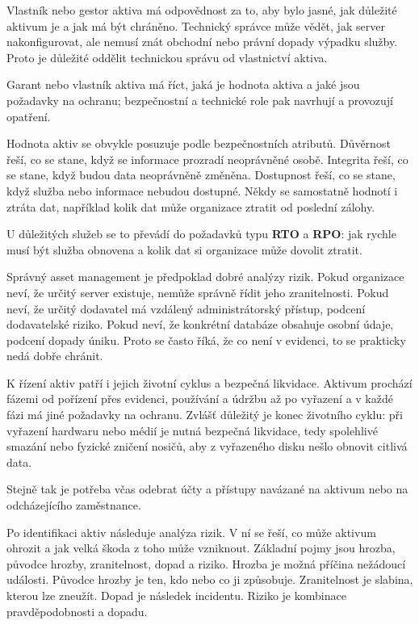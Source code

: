 Vlastník nebo gestor aktiva má odpovědnost za to, aby bylo jasné, jak důležité aktivum je a jak má být chráněno. Technický správce může vědět, jak server nakonfigurovat, ale nemusí znát obchodní nebo právní dopady výpadku služby. Proto je důležité oddělit technickou správu od vlastnictví aktiva.

Garant nebo vlastník aktiva má říct, jaká je hodnota aktiva a jaké jsou požadavky na ochranu; bezpečnostní a technické role pak navrhují a provozují opatření.

Hodnota aktiv se obvykle posuzuje podle bezpečnostních atributů. Důvěrnost řeší, co se stane, když se informace prozradí neoprávněné osobě. Integrita řeší, co se stane, když budou data neoprávněně změněna. Dostupnost řeší, co se stane, když služba nebo informace nebudou dostupné. Někdy se samostatně hodnotí i ztráta dat, například kolik dat může organizace ztratit od poslední zálohy.

U důležitých služeb se to převádí do požadavků typu \textbf{RTO} a \textbf{RPO}: jak rychle musí být služba obnovena a kolik dat si organizace může dovolit ztratit.

Správný asset management je předpoklad dobré analýzy rizik. Pokud organizace neví, že určitý server existuje, nemůže správně řídit jeho zranitelnosti. Pokud neví, že určitý dodavatel má vzdálený administrátorský přístup, podcení dodavatelské riziko. Pokud neví, že konkrétní databáze obsahuje osobní údaje, podcení dopady úniku. Proto se často říká, že co není v evidenci, to se prakticky nedá dobře chránit.

K řízení aktiv patří i jejich životní cyklus a bezpečná likvidace. Aktivum prochází fázemi od pořízení přes evidenci, používání a údržbu až po vyřazení a v každé fázi má jiné požadavky na ochranu. Zvlášť důležitý je konec životního cyklu: při vyřazení hardwaru nebo médií je nutná bezpečná likvidace, tedy spolehlivé smazání nebo fyzické zničení nosičů, aby z vyřazeného disku nešlo obnovit citlivá data.

Stejně tak je potřeba včas odebrat účty a přístupy navázané na aktivum nebo na odcházejícího zaměstnance.

Po identifikaci aktiv následuje analýza rizik. V ní se řeší, co může aktivum ohrozit a jak velká škoda z toho může vzniknout. Základní pojmy jsou hrozba, původce hrozby, zranitelnost, dopad a riziko. Hrozba je možná příčina nežádoucí události. Původce hrozby je ten, kdo nebo co ji způsobuje. Zranitelnost je slabina, kterou lze zneužít. Dopad je následek incidentu. Riziko je kombinace pravděpodobnosti a dopadu.

